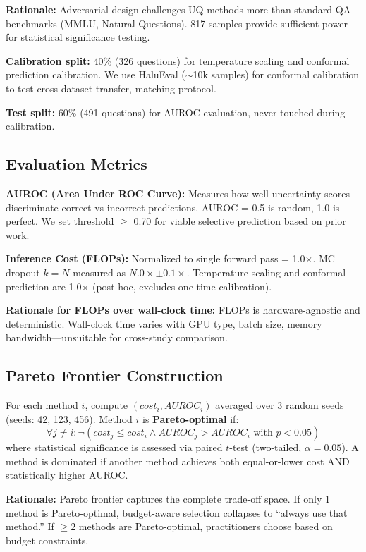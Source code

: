 \textbf{Rationale:} Adversarial design challenges UQ methods more than standard QA benchmarks (MMLU, Natural Questions). 817 samples provide sufficient power for statistical significance testing.

\textbf{Calibration split:} 40\% (326 questions) for temperature scaling and conformal prediction calibration. We use HaluEval ($\sim$10k samples) for conformal calibration to test cross-dataset transfer, matching \cite{su2024conformal} protocol.

\textbf{Test split:} 60\% (491 questions) for AUROC evaluation, never touched during calibration.

\subsection{Evaluation Metrics}

\textbf{AUROC (Area Under ROC Curve):} Measures how well uncertainty scores discriminate correct vs incorrect predictions. AUROC = 0.5 is random, 1.0 is perfect. We set threshold $\geq$ 0.70 for viable selective prediction based on prior work.

\textbf{Inference Cost (FLOPs):} Normalized to single forward pass = 1.0$\times$. MC dropout $k=N$ measured as $N.0\times \pm 0.1\times$. Temperature scaling and conformal prediction are 1.0$\times$ (post-hoc, excludes one-time calibration).

\textbf{Rationale for FLOPs over wall-clock time:} FLOPs is hardware-agnostic and deterministic. Wall-clock time varies with GPU type, batch size, memory bandwidth---unsuitable for cross-study comparison.

\subsection{Pareto Frontier Construction}

For each method $i$, compute $(cost_i, AUROC_i)$ averaged over 3 random seeds (seeds: 42, 123, 456). Method $i$ is \textbf{Pareto-optimal} if:
\begin{equation}
\forall j \neq i: \neg(cost_j \leq cost_i \land AUROC_j > AUROC_i \text{ with } p < 0.05)
\end{equation}
where statistical significance is assessed via paired $t$-test (two-tailed, $\alpha = 0.05$). A method is dominated if another method achieves both equal-or-lower cost AND statistically higher AUROC.

\textbf{Rationale:} Pareto frontier captures the complete trade-off space. If only 1 method is Pareto-optimal, budget-aware selection collapses to ``always use that method.'' If $\geq2$ methods are Pareto-optimal, practitioners choose based on budget constraints.

